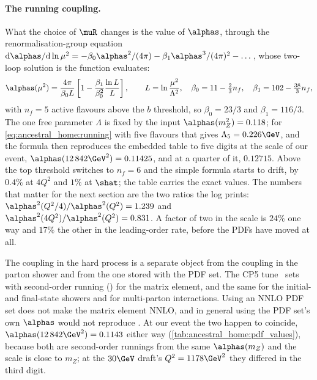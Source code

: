 \paragraph{The running coupling.} What the choice of $\muR$ changes is the
value of $\alphas$, through the renormalisation-group equation
$\mathrm{d}\alphas/\mathrm{d}\ln\mu^2=-\beta_0\alphas^2/(4\pi)-\beta_1\alphas^3/(4\pi)^2-\dots$,
whose two-loop solution is the function \PYTHIA evaluates:
\begin{equation}
  \alphas(\mu^2)=\frac{4\pi}{\beta_0L}\left[1-\frac{\beta_1}{\beta_0^2}\frac{\ln L}{L}\right],
  \qquad L=\ln\frac{\mu^2}{\Lambda^2},\quad
  \beta_0=11-\tfrac23n_f,\quad \beta_1=102-\tfrac{38}{3}n_f ,
  \label{eq:ancestral_home:running}
\end{equation}
with $n_f=5$ active flavours above the $b$ threshold, so $\beta_0=23/3$ and
$\beta_1=116/3$. The one free parameter $\Lambda$ is fixed by the input
$\alphas(m_Z^2)=0.118$; for \cref{eq:ancestral_home:running} with five
flavours that gives $\Lambda_5=0.226\GeV$, and the formula then reproduces
the embedded table to five digits at the scale of our event,
$\alphas(12\,842\GeV^2)=0.11425$, and at a quarter of it, $0.12715$. Above
the top threshold \PYTHIA switches to $n_f=6$ and the simple formula starts
to drift, by $0.4\%$ at $4Q^2$ and $1\%$ at $\shat$; the table carries the
exact values. The numbers that matter for the next section are the two
ratios the log prints: $\alphas^2(Q^2/4)/\alphas^2(Q^2)=1.239$ and
$\alphas^2(4Q^2)/\alphas^2(Q^2)=0.831$. A factor of two in the scale is
$24\%$ one way and $17\%$ the other in the leading-order rate, before the
PDFs have moved at all.

The coupling in the hard process is a separate object from the coupling in
the parton shower and from the one stored with the PDF set. The CP5
tune~\cite{CMS:2019csb} sets  with
second-order running () for the matrix element, and the
same for the initial- and final-state showers and for multi-parton
interactions. Using an NNLO PDF set does not make the matrix element NNLO,
and in general using the PDF set's own $\alphas$ would not reproduce
\PYTHIA. At our event the two happen to coincide,
$\alphas(12\,842\GeV^2)=0.1143$ either way
(\cref{tab:ancestral_home:pdf_values}), because both are second-order
runnings from the same $\alphas(m_Z)$ and the scale is close to $m_Z$;
at the $30\GeV$ draft's $Q^2=1178\GeV^2$ they differed in the third digit.


